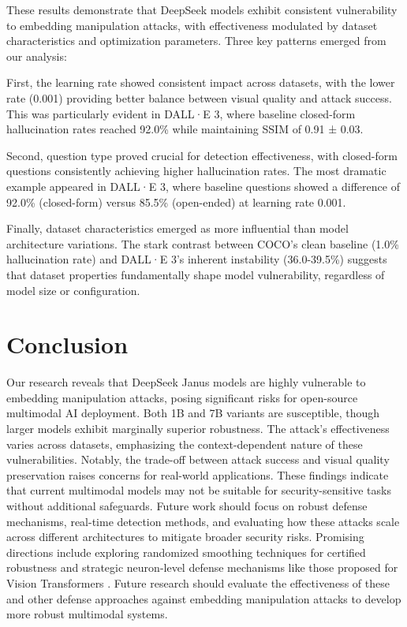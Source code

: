\documentclass[runningheads]{llncs}
\begin{document}
These results demonstrate that DeepSeek models exhibit consistent vulnerability to embedding manipulation attacks, with effectiveness modulated by dataset characteristics and optimization parameters. Three key patterns emerged from our analysis:

First, the learning rate showed consistent impact across datasets, with the lower rate (0.001) providing better balance between visual quality and attack success. This was particularly evident in DALL·E 3, where baseline closed-form hallucination rates reached 92.0\% while maintaining SSIM of 0.91 ± 0.03.

Second, question type proved crucial for detection effectiveness, with closed-form questions consistently achieving higher hallucination rates. The most dramatic example appeared in DALL·E 3, where baseline questions showed a difference of 92.0\% (closed-form) versus 85.5\% (open-ended) at learning rate 0.001.

Finally, dataset characteristics emerged as more influential than model architecture variations. The stark contrast between COCO's clean baseline (1.0\% hallucination rate) and DALL·E 3's inherent instability (36.0-39.5\%) suggests that dataset properties fundamentally shape model vulnerability, regardless of model size or configuration.

\section{Conclusion}
Our research reveals that DeepSeek Janus models are highly vulnerable to embedding manipulation attacks, posing significant risks for open-source multimodal AI deployment. Both 1B and 7B variants are susceptible, though larger models exhibit marginally superior robustness. The attack's effectiveness varies across datasets, emphasizing the context-dependent nature of these vulnerabilities. Notably, the trade-off between attack success and visual quality preservation raises concerns for real-world applications. These findings indicate that current multimodal models may not be suitable for security-sensitive tasks without additional safeguards. Future work should focus on robust defense mechanisms, real-time detection methods, and evaluating how these attacks scale across different architectures to mitigate broader security risks. Promising directions include exploring randomized smoothing techniques for certified robustness \cite{cohen2019certifiedadversarialrobustnessrandomized} and strategic neuron-level defense mechanisms like those proposed for Vision Transformers \cite{islam2025mechanisticunderstandingsrepresentationvulnerabilities}. Future research should evaluate the effectiveness of these and other defense approaches against embedding manipulation attacks to develop more robust multimodal systems.
\end{document}
